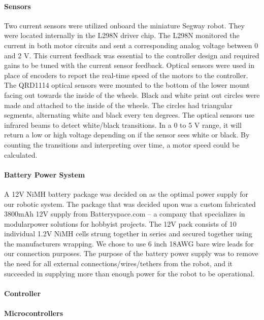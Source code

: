 \documentclass[11pt]{report}
\begin{document}
\begin{spacing}{1.5}
        \paragraph{Sensors}
        
        Two current sensors were utilized onboard the miniature Segway robot. They were located internally in the L298N driver chip. The L298N monitored the current in both motor circuits and sent a corresponding analog voltage between 0 and 2 V. This current feedback was essential to the controller design and required gains to be tuned with the current sensor feedback. Optical sensors were used in place of encoders to report the real-time speed of the motors to the controller. The QRD1114 optical sensors were mounted to the bottom of the lower mount facing out towards the inside of the wheels. Black and white print out circles were made and attached to the inside of the wheels. The circles had triangular segments, alternating white and black every ten degrees. The optical sensors use infrared beams to detect white/black transitions. In a 0 to 5 V range, it will return a low or high voltage depending on if the sensor sees white or black. By counting the transitions and interpreting over time, a motor speed could be calculated.
        
        \paragraph{Battery Power System}
        
        A 12V NiMH battery package was decided on as the optimal power supply for our robotic system. The package that was decided upon was a custom fabricated 3800mAh 12V supply from Batteryspace.com – a company that specializes in modularpower solutions for hobbyist projects. The 12V pack consists of 10 individual 1.2V NiMH cells strung together in series and secured together using the manufacturers wrapping. We chose to use 6 inch 18AWG bare wire leads for our connection purposes. The purpose of the battery power supply was to remove the need for all external connections/wires/tethers from the robot, and it succeeded in supplying more than enough power for the robot to be operational.
        
        \paragraph{Controller}
        
        \paragraph{Microcontrollers}
        

\end{spacing}
\end{document}

